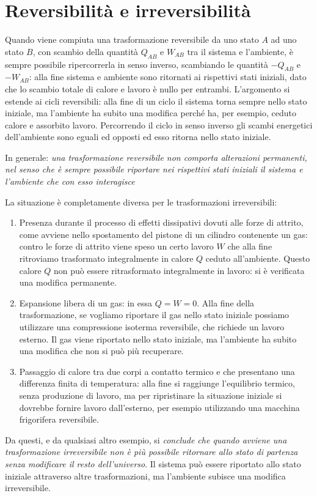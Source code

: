 \documentclass[class=book, crop=false, oneside, 12pt]{standalone}
\begin{document}
\section{Reversibilità e irreversibilità}

Quando viene compiuta una trasformazione reversibile da uno stato \(A\) ad uno stato \(B\), con scambio della quantità \(Q_{AB}\) e \(W_{AB}\) tra il sistema e l'ambiente, è sempre possibile ripercorrerla in senso inverso, scambiando le quantità \(-Q_{AB}\) e \(-W_{AB}\): alla fine sistema e ambiente sono ritornati ai rispettivi stati iniziali, dato che lo scambio totale di calore e lavoro è nullo per entrambi. 
L'argomento si estende ai cicli reversibili: alla fine di un ciclo il sistema torna sempre nello stato iniziale, ma l'ambiente ha subito una modifica perché ha, per esempio, ceduto calore e assorbito lavoro. 
Percorrendo il ciclo in senso inverso gli scambi energetici dell'ambiente sono eguali ed opposti ed esso ritorna nello stato iniziale.

In generale: \emph{una trasformazione reversibile non comporta alterazioni permanenti, nel senso che è sempre possibile riportare nei rispettivi stati iniziali il sistema e l'ambiente che con esso interagisce}

La situazione è completamente diversa per le trasformazioni irreversibili:
\begin{enumerate}
    \item Presenza durante il processo di effetti dissipativi dovuti alle forze di attrito, come avviene nello spostamento del pistone di un cilindro contenente un gas: contro le forze di attrito viene speso un certo lavoro \(W\) che alla fine ritroviamo trasformato integralmente in calore \(Q\) ceduto all'ambiente. 
    Questo calore \(Q\) non può essere ritrasformato integralmente in lavoro: si è verificata una modifica permanente. 
    \item Espansione libera di un gas: in essa \(Q = W = 0\). 
    Alla fine della trasformazione, se vogliamo riportare il gas nello stato iniziale possiamo utilizzare una compressione isoterma reversibile, che richiede un lavoro esterno. 
    Il gas viene riportato nello stato iniziale, ma l'ambiente ha subito una modifica che non si può più recuperare. 
    \item Passaggio di calore tra due corpi a contatto termico e che presentano una differenza finita di temperatura: alla fine si raggiunge l'equilibrio termico, senza produzione di lavoro, ma per ripristinare la situazione iniziale si dovrebbe fornire lavoro dall'esterno, per esempio utilizzando una macchina frigorifera reversibile.
\end{enumerate}
Da questi, e da qualsiasi altro esempio, si \emph{conclude che quando avviene una trasformazione irreversibile non è più possibile ritornare allo stato di partenza senza modificare il resto dell'universo}. 
Il sistema può essere riportato allo stato iniziale attraverso altre trasformazioni, ma l'ambiente subisce una modifica irreversibile.
\end{document}
